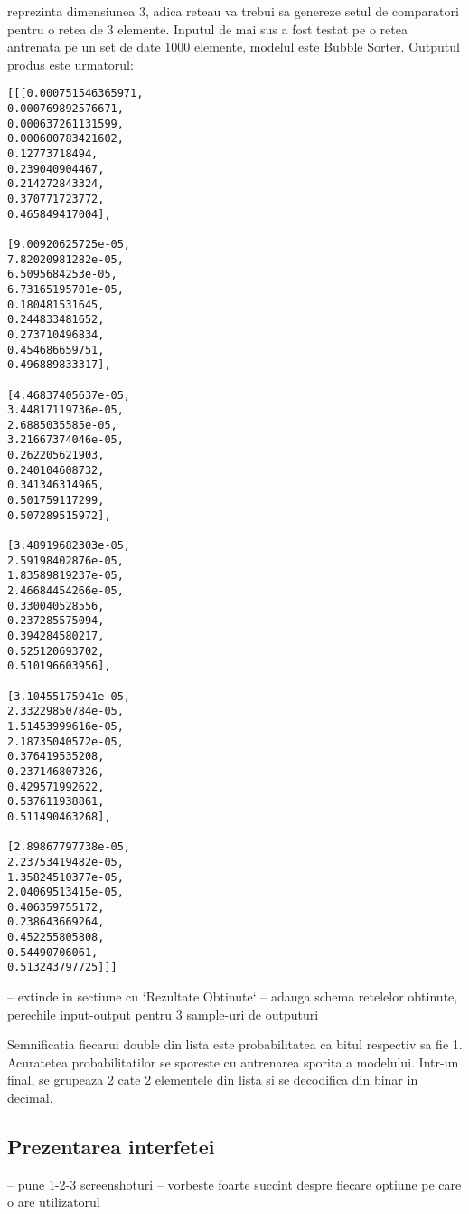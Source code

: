 \documentclass[12pt]{article}
\begin{document}
reprezinta dimensiunea 3, adica reteau va trebui sa genereze setul de comparatori pentru o retea de 3 elemente. Inputul de mai sus a fost testat pe o retea antrenata pe un set de date 1000 elemente, modelul este Bubble Sorter. Outputul produs este urmatorul:
\begin{center}
\begin{multicols}{2}
\begin{lstlisting}
[[[0.000751546365971,
0.000769892576671,
0.000637261131599,
0.000600783421602,
0.12773718494,
0.239040904467,
0.214272843324,
0.370771723772,
0.465849417004],

[9.00920625725e-05,
7.82020981282e-05,
6.5095684253e-05,
6.73165195701e-05,
0.180481531645,
0.244833481652,
0.273710496834,
0.454686659751,
0.496889833317],

[4.46837405637e-05,
3.44817119736e-05,
2.6885035585e-05,
3.21667374046e-05,
0.262205621903,
0.240104608732,
0.341346314965,
0.501759117299,
0.507289515972],

[3.48919682303e-05,
2.59198402876e-05,
1.83589819237e-05,
2.46684454266e-05,
0.330040528556,
0.237285575094,
0.394284580217,
0.525120693702,
0.510196603956],

[3.10455175941e-05,
2.33229850784e-05,
1.51453999616e-05,
2.18735040572e-05,
0.376419535208,
0.237146807326,
0.429571992622,
0.537611938861,
0.511490463268],

[2.89867797738e-05,
2.23753419482e-05,
1.35824510377e-05,
2.04069513415e-05,
0.406359755172,
0.238643669264,
0.452255805808,
0.54490706061,
0.513243797725]]]
\end{lstlisting}
\end{multicols}
\end{center}

-- extinde in sectiune cu `Rezultate Obtinute`
-- adauga schema retelelor obtinute, perechile input-output pentru 3 sample-uri de outputuri
 
Semnificatia fiecarui double din lista este probabilitatea ca bitul respectiv sa fie 1. Acuratetea probabilitatilor se sporeste cu antrenarea sporita a modelului. Intr-un final, se grupeaza 2 cate 2 elementele din lista si se decodifica din binar in decimal.

\subsection{Prezentarea interfetei}

-- pune 1-2-3 screenshoturi
-- vorbeste foarte succint despre fiecare optiune pe care o are utilizatorul
\end{document}
